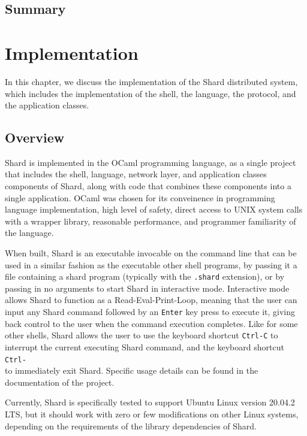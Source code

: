 \documentclass[twoside]{report}
\newcommand{\todoi}[1]{\todo[inline, color=blue!20]{TODO: {#1}}}
\begin{document}
\section{Summary}

\todoi{Write the summary}

\chapter{Implementation}

In this chapter, we discuss the implementation of the Shard distributed system, which includes the implementation of the shell, the language, the protocol, and the application classes.

\section{Overview}

Shard is implemented in the OCaml programming language, as a single project that includes the shell, language, network layer, and application classes components of Shard, along with code that combines these components into a single application.
OCaml was chosen for its conveinence in programming language implementation, high level of safety, direct access to UNIX system calls with a wrapper library, reasonable performance, and programmer familiarity of the language.

When built, Shard is an executable invocable on the command line that can be used in a similar fashion as the executable other shell programs, by passing it a file containing a shard program (typically with the \texttt{.shard} extension), or by passing in no arguments to start Shard in interactive mode.
Interactive mode allows Shard to function as a Read-Eval-Print-Loop, meaning that the user can input any Shard command followed by an \texttt{Enter} key press to execute it, giving back control to the user when the command execution completes.
Like for some other shells, Shard allows the user to use the keyboard shortcut \texttt{Ctrl-C} to interrupt the current executing Shard command, and the keyboard shortcut \texttt{Ctrl-\\} to immediately exit Shard.
Specific usage details can be found in the documentation of the project.

Currently, Shard is specifically tested to support Ubuntu Linux version 20.04.2 LTS, but it should work with zero or few modifications on other Linux systems, depending on the requirements of the library dependencies of Shard.
\end{document}
